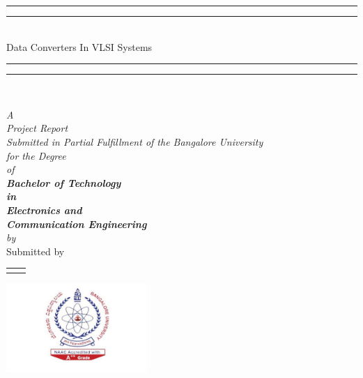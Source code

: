 \begin{titlepage}

  \vspace{1 in}
  \begin{center}
  \newcommand*{\titlegroup}{
    \centering
    \vspace*{\baselineskip} %
	
	\rule{\textwidth}{1.6pt}\vspace*{-\baselineskip}\vspace*{2pt} %
	\rule{\textwidth}{0.4pt}\\[\baselineskip] %
	{\LARGE Data Converters In VLSI Systems} \\
	
	\rule{\textwidth}{0.4pt}\vspace*{-\baselineskip}\vspace{3.2pt} %
	\rule{\textwidth}{1.6pt}\\[\baselineskip] %
	
	\scshape %
	
	\vspace*{1\baselineskip} %
	{\large{\textsl{
				{A \\ 
					  Project Report \\ %
					Submitted in Partial Fulfillment of the Bangalore University\\
					for the Degree \\ 
					of\\
					\large \bf Bachelor of Technology \\
                    in\\
                    \large \bf Electronics and \\
                    \large \bf Communication Engineering 
	}}}}\\
	[5ex] \emph{by} \\[1ex]
	Submitted by \\[\baselineskip]
  \begin{tabular}{l l}
    \memberA & \indexA \\
  \end{tabular}
  }

  \titlegroup

  \includegraphics[width=0.4\textwidth]{figs/university_logo.png} \\[1cm]


\end{center}
\end{titlepage}
